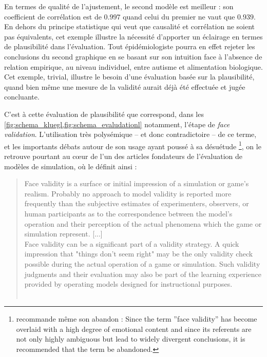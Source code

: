 En termes de qualité de l'ajustement, le second modèle est meilleur : son coefficient de corrélation est de $0.997$ quand celui du premier ne vaut que $0.939$.
En dehors du principe statistique qui veut que causalité et corrélation ne soient pas équivalents, cet exemple illustre la nécessité d'apporter un éclairage en termes de plausibilité dans l'évaluation.
Tout épidémiologiste pourra en effet rejeter les conclusions du second graphique en se basant sur son intuition face à l'absence de relation empirique, au niveau individuel, entre autisme et alimentation biologique.
Cet exemple, trivial, illustre le besoin d'une évaluation basée sur la plausibilité, quand bien même une mesure de la validité aurait déjà été effectuée et jugée concluante.

C'est à cette évaluation de plausibilité que correspond, dans les \cref{fig:schema_kluegl,fig:schema_evaludationl} notamment, l'étape de \og \textit{face validation}\fg{}.
L'utilisation très polysémique -- et donc contradictoire -- de ce terme, et les importants débats autour de son usage ayant poussé à sa désuétude
\footnote{
	\cite[205]{mosier_critical_1947} recommande même son abandon : \og Since the term ''face validity'' has become overlaid with a high degree of emotional content and since its referents are not only highly ambiguous but lead to widely divergent conclusions, it is recommended that the term be abandoned.\fg{}
}, on le retrouve pourtant au cœur de l'un des articles fondateurs de l'évaluation de modèles de simulation, où \citeauthor{hermann_validation_1967} le définit ainsi :

\begin{quotation}
	\noindent \og
	Face validity is a surface or initial impression of a simulation or game's realism.
	Probably no approach to model validity is reported more frequently than the subjective estimates of experimenters, observers, or human participants as to the correspondence between the model's operation and their perception of the actual phenomena which the game or simulation represent.
	[...]\\
	Face validity can be a significant part of a validity strategy.
	A quick impression that "things don't seem right" may be the only validity check possible during the actual operation of a game or simulation.
	Such validity judgments and their evaluation may also be part of the learning experience provided by operating models designed for instructional purposes.
	\fg{}\\
	\mbox{}~ \hfill \textcite[221]{hermann_validation_1967}
\end{quotation}

